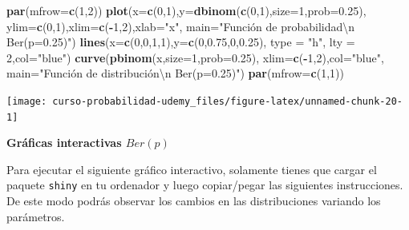 \documentclass[]{book}
\newenvironment{Shaded}{\begin{snugshade}}{\end{snugshade}}
\newcommand{\CharTok}[1]{\textcolor[rgb]{0.31,0.60,0.02}{#1}}
\newcommand{\DataTypeTok}[1]{\textcolor[rgb]{0.13,0.29,0.53}{#1}}
\newcommand{\DecValTok}[1]{\textcolor[rgb]{0.00,0.00,0.81}{#1}}
\newcommand{\FloatTok}[1]{\textcolor[rgb]{0.00,0.00,0.81}{#1}}
\newcommand{\KeywordTok}[1]{\textcolor[rgb]{0.13,0.29,0.53}{\textbf{#1}}}
\newcommand{\NormalTok}[1]{#1}
\newcommand{\OperatorTok}[1]{\textcolor[rgb]{0.81,0.36,0.00}{\textbf{#1}}}
\newcommand{\StringTok}[1]{\textcolor[rgb]{0.31,0.60,0.02}{#1}}
\begin{document}
\begin{Shaded}
\begin{Highlighting}[]
\KeywordTok{par}\NormalTok{(}\DataTypeTok{mfrow=}\KeywordTok{c}\NormalTok{(}\DecValTok{1}\NormalTok{,}\DecValTok{2}\NormalTok{))}
\KeywordTok{plot}\NormalTok{(}\DataTypeTok{x=}\KeywordTok{c}\NormalTok{(}\DecValTok{0}\NormalTok{,}\DecValTok{1}\NormalTok{),}\DataTypeTok{y=}\KeywordTok{dbinom}\NormalTok{(}\KeywordTok{c}\NormalTok{(}\DecValTok{0}\NormalTok{,}\DecValTok{1}\NormalTok{),}\DataTypeTok{size=}\DecValTok{1}\NormalTok{,}\DataTypeTok{prob=}\FloatTok{0.25}\NormalTok{),}
     \DataTypeTok{ylim=}\KeywordTok{c}\NormalTok{(}\DecValTok{0}\NormalTok{,}\DecValTok{1}\NormalTok{),}\DataTypeTok{xlim=}\KeywordTok{c}\NormalTok{(}\OperatorTok{-}\DecValTok{1}\NormalTok{,}\DecValTok{2}\NormalTok{),}\DataTypeTok{xlab=}\StringTok{"x"}\NormalTok{,}
     \DataTypeTok{main=}\StringTok{"Función de probabilidad}\CharTok{\textbackslash{}n}\StringTok{ Ber(p=0.25)"}\NormalTok{)}
\KeywordTok{lines}\NormalTok{(}\DataTypeTok{x=}\KeywordTok{c}\NormalTok{(}\DecValTok{0}\NormalTok{,}\DecValTok{0}\NormalTok{,}\DecValTok{1}\NormalTok{,}\DecValTok{1}\NormalTok{),}\DataTypeTok{y=}\KeywordTok{c}\NormalTok{(}\DecValTok{0}\NormalTok{,}\FloatTok{0.75}\NormalTok{,}\DecValTok{0}\NormalTok{,}\FloatTok{0.25}\NormalTok{), }\DataTypeTok{type =} \StringTok{"h"}\NormalTok{, }\DataTypeTok{lty =} \DecValTok{2}\NormalTok{,}\DataTypeTok{col=}\StringTok{"blue"}\NormalTok{)}
\KeywordTok{curve}\NormalTok{(}\KeywordTok{pbinom}\NormalTok{(x,}\DataTypeTok{size=}\DecValTok{1}\NormalTok{,}\DataTypeTok{prob=}\FloatTok{0.25}\NormalTok{),}
      \DataTypeTok{xlim=}\KeywordTok{c}\NormalTok{(}\OperatorTok{-}\DecValTok{1}\NormalTok{,}\DecValTok{2}\NormalTok{),}\DataTypeTok{col=}\StringTok{"blue"}\NormalTok{,}
      \DataTypeTok{main=}\StringTok{"Función de distribución\textbackslash{}n Ber(p=0.25)"}\NormalTok{)}
\KeywordTok{par}\NormalTok{(}\DataTypeTok{mfrow=}\KeywordTok{c}\NormalTok{(}\DecValTok{1}\NormalTok{,}\DecValTok{1}\NormalTok{))}
\end{Highlighting}
\end{Shaded}

\begin{center}\texttt{[image: curso-probabilidad-udemy\_files/figure-latex/unnamed-chunk-20-1]} \end{center}

\textbf{Gráficas interactivas \(Ber(p)\)}

Para ejecutar el siguiente gráfico interactivo, solamente tienes que cargar el paquete \texttt{shiny} en tu ordenador y luego copiar/pegar las siguientes instrucciones. De este modo podrás observar los cambios en las distribuciones variando los parámetros.
\end{document}
